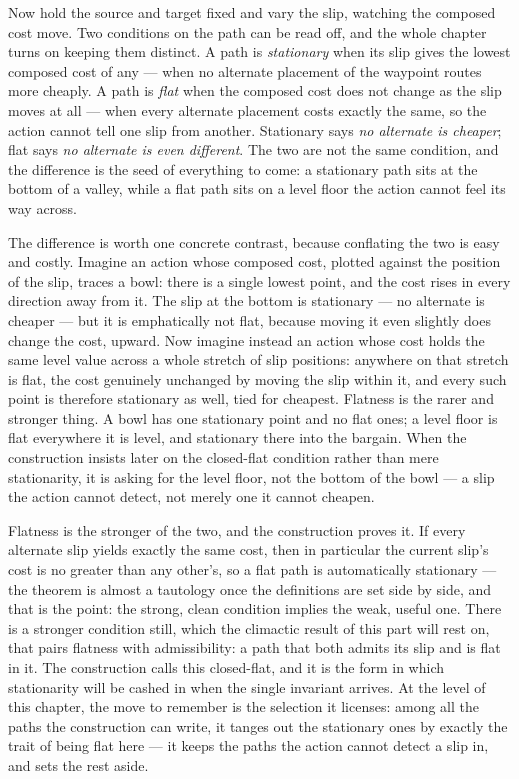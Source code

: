 Now hold the source and target fixed and vary the slip, watching the composed cost move. Two
conditions on the path can be read off, and the whole chapter turns on keeping them distinct. A path
is \emph{stationary} when its slip gives the lowest composed cost of any --- when no alternate
placement of the waypoint routes more cheaply. A path is \emph{flat} when the composed cost does not
change as the slip moves at all --- when every alternate placement costs exactly the same, so the
action cannot tell one slip from another. Stationary says \emph{no alternate is cheaper}; flat says
\emph{no alternate is even different}. The two are not the same condition, and the difference is the
seed of everything to come: a stationary path sits at the bottom of a valley, while a flat path sits
on a level floor the action cannot feel its way across.

The difference is worth one concrete contrast, because conflating the two is easy and costly. Imagine
an action whose composed cost, plotted against the position of the slip, traces a bowl: there is a
single lowest point, and the cost rises in every direction away from it. The slip at the bottom is
stationary --- no alternate is cheaper --- but it is emphatically not flat, because moving it even
slightly does change the cost, upward. Now imagine instead an action whose cost holds the same level
value across a whole stretch of slip positions: anywhere on that stretch is flat, the cost genuinely
unchanged by moving the slip within it, and every such point is therefore stationary as well, tied for
cheapest. Flatness is the rarer and stronger thing. A bowl has one stationary point and no flat ones; a
level floor is flat everywhere it is level, and stationary there into the bargain. When the
construction insists later on the closed-flat condition rather than mere stationarity, it is asking for
the level floor, not the bottom of the bowl --- a slip the action cannot detect, not merely one it
cannot cheapen.

Flatness is the stronger of the two, and the construction proves it. If every alternate slip yields
exactly the same cost, then in particular the current slip's cost is no greater than any other's, so a
flat path is automatically stationary --- the theorem is almost a tautology once the definitions are
set side by side, and that is the point: the strong, clean condition implies the weak, useful one.
There is a stronger condition still, which the climactic result of this part will rest on, that pairs
flatness with admissibility: a path that both admits its slip and is flat in it. The construction calls
this closed-flat, and it is the form in which stationarity will be cashed in when the single invariant
arrives. At the level of this chapter, the move to remember is the selection it licenses: among all the
paths the construction can write, it tanges out the stationary ones by exactly the trait of being flat
here --- it keeps the paths the action cannot detect a slip in, and sets the rest aside.

